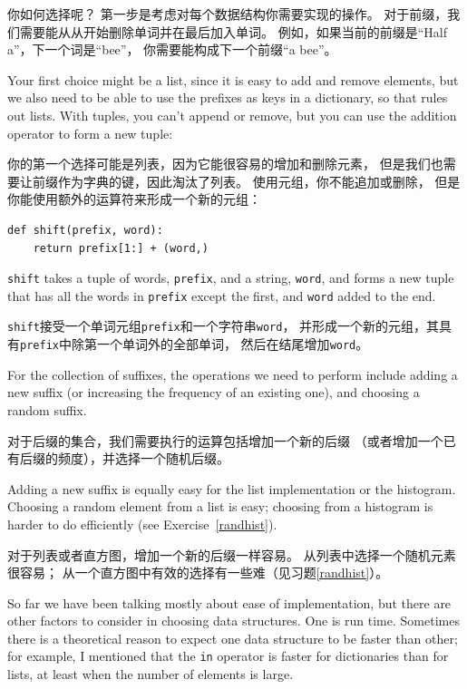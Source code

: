 \documentclass[10pt]{book}
\begin{document}
\begin{CJK}{UTF8}{gbsn}
你如何选择呢？
第一步是考虑对每个数据结构你需要实现的操作。
对于前缀，我们需要能从从开始删除单词并在最后加入单词。
例如，如果当前的前缀是``Half a''，下一个词是``bee''，
你需要能构成下一个前缀``a bee''。

Your first choice might be a list, since it is easy to add
and remove elements, but we also need to be able to use the
prefixes as keys in a dictionary, so that rules out lists.
With tuples, you can't append or remove, but you can use
the addition operator to form a new tuple:

你的第一个选择可能是列表，因为它能很容易的增加和删除元素，
但是我们也需要让前缀作为字典的键，因此淘汰了列表。
使用元组，你不能追加或删除，
但是你能使用额外的运算符来形成一个新的元组：

\begin{verbatim}
def shift(prefix, word):
    return prefix[1:] + (word,)
\end{verbatim}
%
{\tt shift} takes a tuple of words, {\tt prefix}, and a string, 
{\tt word}, and forms a new tuple that has all the words
in {\tt prefix} except the first, and {\tt word} added to
the end.

{\tt shift}接受一个单词元组{\tt prefix}和一个字符串{\tt word}，
并形成一个新的元组，其具有{\tt prefix}中除第一个单词外的全部单词，
然后在结尾增加{\tt word}。

For the collection of suffixes, the operations we need to
perform include adding a new suffix (or increasing the frequency
of an existing one), and choosing a random suffix.

对于后缀的集合，我们需要执行的运算包括增加一个新的后缀
（或者增加一个已有后缀的频度），并选择一个随机后缀。

Adding a new suffix is equally easy for the list implementation
or the histogram.  Choosing a random element from a list
is easy; choosing from a histogram is harder to do
efficiently (see Exercise~\ref{randhist}).

对于列表或者直方图，增加一个新的后缀一样容易。
从列表中选择一个随机元素很容易；
从一个直方图中有效的选择有一些难（见习题\ref{randhist}）。

So far we have been talking mostly about ease of implementation,
but there are other factors to consider in choosing data structures.
One is run time.  Sometimes there is a theoretical reason to expect
one data structure to be faster than other; for example, I mentioned
that the {\tt in} operator is faster for dictionaries than for lists,
at least when the number of elements is large.


\end{CJK}
\end{document}
